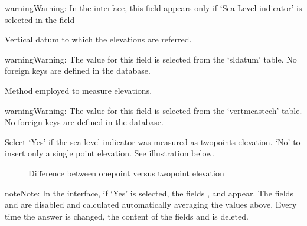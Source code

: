 \documentclass[letterpaper,10pt,english]{sphinxmanual}
\begin{document}
\begin{sphinxadmonition}{warning}{Warning:}
In the interface, this field appears only if ‘Sea Level indicator’ is selected in the field 
\end{sphinxadmonition}

 \sphinxhyphen{} Vertical datum to which the elevations are referred.

\begin{sphinxadmonition}{warning}{Warning:}
The value for this field is selected from the ‘sldatum’ table. No foreign keys are defined in the database.
\end{sphinxadmonition}

 \sphinxhyphen{} Method employed to measure elevations.

\begin{sphinxadmonition}{warning}{Warning:}
The value for this field is selected from the ‘vertmeastech’ table. No foreign keys are defined in the database.
\end{sphinxadmonition}

 \sphinxhyphen{} Select ‘Yes’ if the sea level indicator was measured as two\sphinxhyphen{}points elevation. ‘No’ to insert only a single point elevation. See illustration below.

\begin{figure}[htbp]
\centering
\capstart

\noindent{}
\caption{Difference between one\sphinxhyphen{}point versus two\sphinxhyphen{}point elevation}\label{\detokenize{RSL_data:id6}}\end{figure}

\begin{sphinxadmonition}{note}{Note:}
In the interface, if ‘Yes’ is selected, the fields ,  and   appear. The fields  and  are disabled and calculated automatically averaging the values above. Every time the answer is changed, the content of the fields  and  is deleted.
\end{sphinxadmonition}
\end{document}
